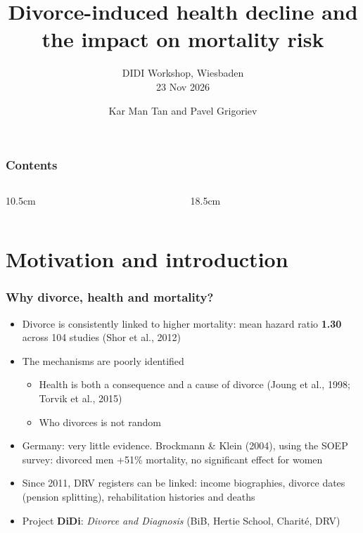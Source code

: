 \documentclass[t,20pt]{beamer}
\title{Divorce-induced health decline and the impact on mortality risk}
\subtitle{DIDI Workshop, Wiesbaden\\23 Nov 2026}
\author{Kar Man Tan and Pavel Grigoriev}
\newcommand{\hl}[1]{\textcolor{BiBViolett}{\textbf{#1}}}           %
\newcommand{\ct}[1]{{\color{BiBBlau80}(#1)}}                        %
\begin{document}
\begin{bibframe}[frametype=titleen]
  \titlepage
\end{bibframe}

\begin{bibframe}[frametype=agenda]
  \frametitle{Contents}
  \begin{columns}
    \begin{column}{10.5cm}
    \end{column}
    \begin{column}{18.5cm}
      \tableofcontents[hideallsubsections]
    \end{column}
  \end{columns}
\end{bibframe}

\section{Motivation and introduction}

\begin{bibframe}
  \frametitle{Why divorce, health and mortality?}
  \begin{itemize}
    \item Divorce is consistently linked to higher mortality: mean hazard ratio \hl{1.30} across 104 studies \ct{Shor et al., 2012}
    \item The mechanisms are poorly identified
    \begin{itemize}
      \item Health is both a consequence and a cause of divorce \ct{Joung et al., 1998; Torvik et al., 2015}
      \item Who divorces is not random
    \end{itemize}
    \item Germany: very little evidence. Brockmann \& Klein (2004), using the SOEP survey: divorced men +51\% mortality, no significant effect for women
    \item Since 2011, DRV registers can be linked: income biographies, divorce dates (pension splitting), rehabilitation histories and deaths
    \item[$\rightarrow$] Project \hl{DiDi}: \textit{Divorce and Diagnosis} (BiB, Hertie School, Charité, DRV)
  \end{itemize}
\end{bibframe}
\end{document}
